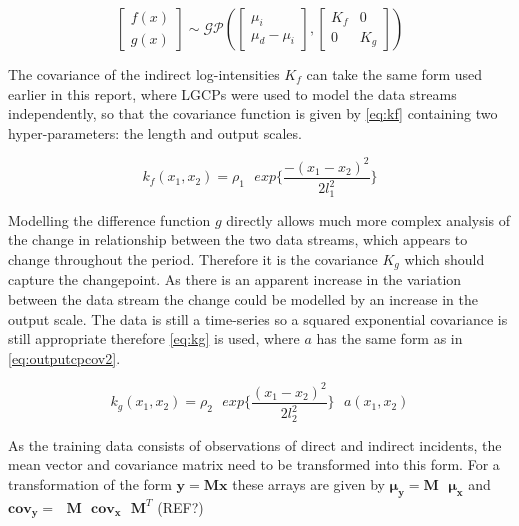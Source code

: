 \documentclass[a4paper,11pt]{report}
\begin{document}
\begin{equation} \label{eq:ccpfandg}
\left[ \begin{array}{cc}
f(x)  \\
g(x) \end{array} \right] \sim \mathcal{G}\mathcal{P} \left( \left[ \begin{array}{cc}
\mu_i  \\
\mu_d - \mu_i \end{array} \right], \left[ \begin{array}{cc}
K_f & 0  \\
0  & K_g \end{array} \right] \right)
\end{equation}

The covariance of the indirect log-intensities \(K_f\) can take the same form used earlier in this report, where LGCPs were used to model the data streams independently, so that the covariance function is given by \ref{eq:kf} containing two hyper-parameters: the length and output scales. 

\begin{equation} \label{eq:kf}
k_f(x_1,x_2) = \rho_1 \text{ }exp\{\frac{-(x_1-x_2)^2}{2 l_1^2}\}
\end{equation}

Modelling the difference function \(g\) directly allows much more complex analysis of the change in relationship between the two data streams, which appears to change throughout the period. Therefore it is the covariance \(K_g\) which should capture the changepoint. As there is an apparent increase in the variation between the data stream the change could be modelled by an increase in the output scale. The data is still a time-series so a squared exponential covariance is still appropriate therefore \ref{eq:kg} is used, where \(a\) has the same form as in \ref{eq:outputcpcov2}.

\begin{equation} \label{eq:kg}
k_g(x_1,x_2) = \rho_2 \text{ }exp\{\frac{(x_1-x_2)^2}{2 l_2^2}\} \text{ } a(x_1,x_2)
\end{equation}


As the training data consists of observations of direct and indirect incidents, the mean vector and covariance matrix need to be transformed into this form. For a transformation of the form \(\mathbf{y}= \mathbf{M} \mathbf{x}\) these arrays are given by \(\boldsymbol{\mu_y}= \mathbf{M}\text{ }\boldsymbol{\mu_x}\) and \(\mathbf{cov_y}= \text{ }\mathbf{M}\text{ } \mathbf{cov_x} \text{ } \mathbf{M}^{T}\) (REF?) \par
\end{document}
